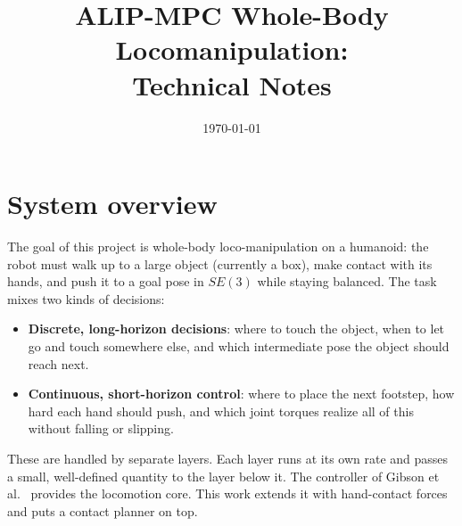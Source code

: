\documentclass[11pt]{article}
\title{ALIP-MPC Whole-Body Locomanipulation:\\ Technical Notes}
\author{}
\date{\today}
\theoremstyle{remark}
\theoremstyle{definition}
\begin{document}
\maketitle

\begin{abstract}

\end{abstract}

\tableofcontents

\section{System overview}\label{sec:overview}
The goal of this project is whole-body loco-manipulation on a humanoid: the robot must walk up to a large
object (currently a box), make contact with its hands, and push it to a goal pose in $SE(3)$ while staying balanced.
The task mixes two kinds of decisions:
\begin{itemize}
  \item \textbf{Discrete, long-horizon decisions}: where to touch the object, when to let go and touch somewhere
        else, and which intermediate pose the object should reach next.
  \item \textbf{Continuous, short-horizon control}: where to place the next footstep, how hard each hand should
        push, and which joint torques realize all of this without falling or slipping.
\end{itemize}
These are handled by separate layers. Each layer runs at its own rate and passes a small, well-defined quantity to
the layer below it. The controller of Gibson et al.~\cite{gibson2022} provides the locomotion core. This work
extends it with hand-contact forces and puts a contact planner on top.
\end{document}
